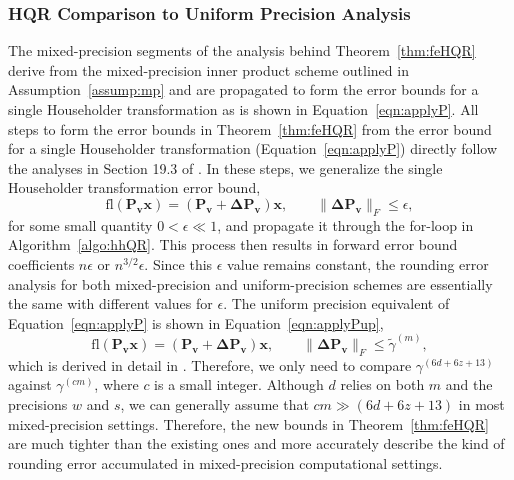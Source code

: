 \documentclass[review,onefignum,onetabnum]{siamart190516}
\newcommand{\bb}[1]{\mathbf{#1}}
\newcommand{\fl}{\mathrm{fl}}
\begin{document}
\subsubsection{HQR Comparison to Uniform Precision Analysis}
\label{sec:mpupHQRcomparison}
The mixed-precision segments of the analysis behind Theorem~\ref{thm:feHQR} derive from the mixed-precision inner product scheme outlined in Assumption~\ref{assump:mp} and are propagated to form the error bounds for a single Householder transformation as is shown in Equation~\ref{eqn:applyP}.
All steps to form the error bounds in Theorem~\ref{thm:feHQR} from the error bound for a single Householder transformation (Equation~\ref{eqn:applyP}) directly follow the analyses in Section 19.3 of \cite{Higham2002}.
In these steps, we generalize the single Householder transformation error bound, 
\begin{equation}
\fl(\bb{P}_{\bb{v}}\bb{x})= (\bb{P}_{\bb{v}} + \bb{\Delta P_{v}})\bb{x},\qquad \|\bb{\Delta P_v}\|_F \leq \epsilon,\label{eqn:applyPgen}
\end{equation}
for some small quantity $0<\epsilon\ll 1$, and propagate it through the for-loop in Algorithm~\ref{algo:hhQR}. 
This process then results in forward error bound coefficients $n\epsilon$ or $n^{3/2}\epsilon$.
Since this $\epsilon$ value remains constant, the rounding error analysis for both mixed-precision and uniform-precision schemes are essentially the same with different values for $\epsilon$.
The uniform precision equivalent of Equation~\ref{eqn:applyP} is shown in Equation~\ref{eqn:applyPup},
\begin{equation}
\fl(\bb{P}_{\bb{v}}\bb{x})= (\bb{P}_{\bb{v}} + \bb{\Delta P_{v}})\bb{x},\qquad \|\bb{\Delta P_v}\|_F \leq \tilde{\gamma}^{(m)},
\label{eqn:applyPup}
\end{equation}
which is derived in detail in \cite{Higham2002}.
Therefore, we only need to compare $\gamma^{(6d+6z+13)}$ against $\gamma^{(cm)}$, where $c$ is a small integer. 
Although $d$ relies on both $m$ and the precisions $w$ and $s$, we can generally assume that $cm\gg (6d+6z+13)$ in most mixed-precision settings.
Therefore, the new bounds in Theorem~\ref{thm:feHQR} are much tighter than the existing ones and more accurately describe the kind of rounding error accumulated in mixed-precision computational settings.
\end{document}
